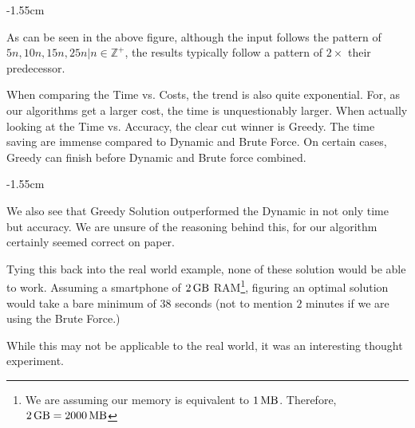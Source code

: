 \documentclass{article}
\begin{document}
\begin{adjustwidth}{-1.55cm}{}
    \centering
\end{adjustwidth}

As can be seen in the above figure, although the input follows the pattern of $5n, 10n, 15n, 25n | n \in \mathbb{Z}^+$, the results typically follow a pattern of $2\times$ their predecessor.

When comparing the Time vs. Costs, the trend is also quite exponential. For, as our algorithms get a larger cost, the time is unquestionably larger. When actually looking at the Time vs. Accuracy, the clear cut winner is Greedy. The time saving are immense compared to Dynamic and Brute Force. On certain cases, Greedy can finish before Dynamic and Brute force combined.

\begin{adjustwidth}{-1.55cm}{}
    \centering
\end{adjustwidth}

We also see that Greedy Solution outperformed the Dynamic in not only time but accuracy. We are unsure of the reasoning behind this, for our algorithm certainly seemed correct on paper.

Tying this back into the real world example, none of these solution would be able to work. Assuming a smartphone of $\SI{2}{\giga\byte}$ RAM\footnote{We are assuming our memory is equivalent to $\SI{1}{\mega\byte}$. Therefore, $\SI{2}{\giga\byte} = \SI{2000}{\mega\byte}$}, figuring an optimal solution would take a bare minimum of $38$ seconds (not to mention $2$ minutes if we are using the Brute Force.)

While this may not be applicable to the real world, it was an interesting thought experiment.
\end{document}
